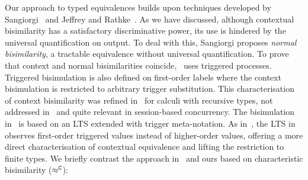 \documentclass[a4paper,UKenglish]{lipics}
\theoremstyle{definition}
\begin{document}
Our approach %
to typed equivalences
builds upon techniques developed by Sangiorgi~\cite{SangiorgiD:expmpa,San96H}
and Jeffrey and Rathke~\cite{JeffreyR05}.
As we have discussed, although contextual bisimilarity has a satisfactory discriminative power,
its use is hindered by the universal quantification on output.
To deal with this, 
Sangiorgi proposes \emph{normal bisimilarity}, 
a tractable  equivalence without universal quantification. 
To prove that context and normal bisimilarities coincide,~\cite{SangiorgiD:expmpa} uses 
triggered processes.
Triggered bisimulation is also defined on first-order labels
where the context bisimulation is restricted to arbitrary
trigger substitution. %
This
characterisation of context bisimilarity  was refined in~\cite{JeffreyR05} for
calculi with recursive types, not addressed in~\cite{San96H,SangiorgiD:expmpa} and
quite relevant in %
session-based concurrency.
The
bisimulation in~\cite{JeffreyR05}
is based on an LTS  extended with trigger meta-notation.
As in~\cite{San96H,SangiorgiD:expmpa}, 
the LTS in~\cite{JeffreyR05}
observes first-order triggered values instead of
higher-order values, offering a more direct characterisation of contextual equivalence
and lifting the restriction to finite types.
We briefly contrast 
the approach in~\cite{JeffreyR05} and ours based on 
characteristic  bisimilarity ($\approx^\mathtt{C}$):
\end{document}
